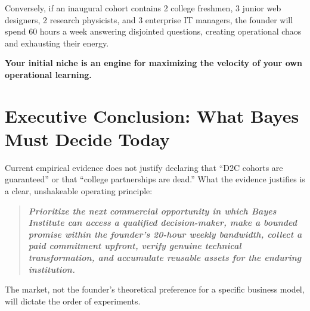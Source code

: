 Conversely, if an inaugural cohort contains 2 college freshmen, 3 junior web designers, 2 research physicists, and 3 enterprise IT managers, the founder will spend 60 hours a week answering disjointed questions, creating operational chaos and exhausting their energy.

\textbf{Your initial niche is an engine for maximizing the velocity of your own operational learning.}

\section{Executive Conclusion: What Bayes Must Decide Today}

Current empirical evidence does not justify declaring that ``D2C cohorts are guaranteed'' or that ``college partnerships are dead.'' What the evidence justifies is a clear, unshakeable operating principle:

\begin{quote}
\bfseries\itshape
Prioritize the next commercial opportunity in which Bayes Institute can access a qualified decision-maker, make a bounded promise within the founder's 20-hour weekly bandwidth, collect a paid commitment upfront, verify genuine technical transformation, and accumulate reusable assets for the enduring institution.
\end{quote}

The market, not the founder's theoretical preference for a specific business model, will dictate the order of experiments.

